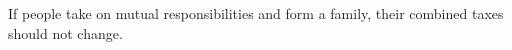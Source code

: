 If people take on mutual responsibilities and form a family, their combined taxes should not change.

